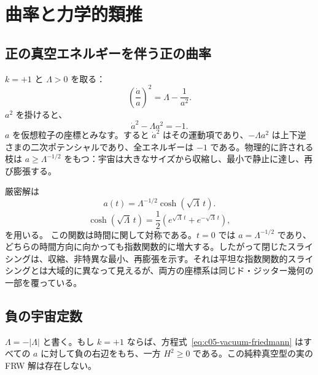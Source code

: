 \section{曲率と力学的類推}

\subsection{正の真空エネルギーを伴う正の曲率}

\(k=+1\) と \(\Lambda>0\) を取る：
\begin{equation}
\left(\frac{\dot a}{a}\right)^2=\Lambda-\frac{1}{a^2}.
\label{eq:c05-closed-vacuum}
\end{equation}
\(a^2\) を掛けると、
\begin{equation}
\dot a^2-\Lambda a^2=-1.
\label{eq:c05-inverted-oscillator}
\end{equation}
\(a\) を仮想粒子の座標とみなす。すると \(\dot a^2\) はその運動項であり、\(-\Lambda a^2\) は上下逆さまの二次ポテンシャルであり、全エネルギーは \(-1\) である。物理的に許される枝は \(a\geq\Lambda^{-1/2}\) をもつ：宇宙は大きなサイズから収縮し、最小で静止に達し、再び膨張する。

厳密解は
\begin{equation}
a(t)=\Lambda^{-1/2}\cosh(\sqrt{\Lambda}\,t).
\label{eq:c05-closed-desitter}
\end{equation}
\begin{equation}
\cosh(\sqrt{\Lambda}\,t)
=
\frac12\left(e^{\sqrt{\Lambda}\,t}+e^{-\sqrt{\Lambda}\,t}\right),
\end{equation} を用いる。
この関数は時間に関して対称である。\(t=0\) では \(a=\Lambda^{-1/2}\) であり、どちらの時間方向に向かっても指数関数的に増大する。したがって閉じたスライシングは、収縮、非特異な最小、再膨張を示す。それは平坦な指数関数的スライシングとは大域的に異なって見えるが、両方の座標系は同じド・ジッター幾何の一部を覆っている。

\subsection{負の宇宙定数}

\(\Lambda=-|\Lambda|\) と書く。もし \(k=+1\) ならば、方程式~\eqref{eq:c05-vacuum-friedmann} はすべての \(a\) に対して負の右辺をもち、一方 \(H^2\geq0\) である。この純粋真空型の実の FRW 解は存在しない。

